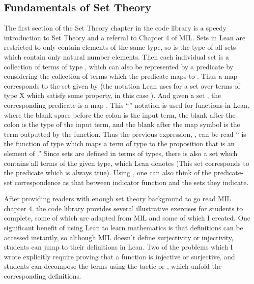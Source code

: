 \subsection{Fundamentals of Set Theory}

The first section of the Set Theory chapter in the code library is 
a speedy introduction to Set Theory and a referral to Chapter 4 of
MIL. Sets in Lean are restricted to only contain elements of the 
same type, so  is the type of all sets which contain
only natural number elements. Then each individual set 
is a collection of terms of type , which can also be represented
by a predicate  by considering the collection
of terms which the predicate maps to . 
Thus a map  corresponds to the set 
 given by  (the notation Lean uses for 
a set over terms of type X which satisfy some property, in this case ). 
And given a set , the corresponding
predicate is a map . 
This ``\lean{$\lambda$ \_ : \_ $\mapsto$ \_}'' notation is used for 
functions in Lean, where the blank space before the colon is the input term, the
blank after the colon is the type of the input term, and the blank after the
map symbol is the term outputted by the function. Thus the previous expression, 
, can be read 
`` is the function of type  which maps a term
 of type  to the proposition that  is an element of .''
Since sets are defined in terms of types, there is also a set which contains 
all terms of the given type, which Lean denotes  (This set
corresponds to the predicate which is always true). Using ,
one can also think of the predicate-set correspondence as
that between indicator function and the sets they indicate.

After providing readers with enough set theory background to go read 
MIL chapter 4, the code library provides several illustrative exercises for
students to complete, some of which are adapted from MIL and some of which I 
created. One significant benefit of using Lean to learn mathematics is that
definitions can be accessed instantly, so although MIL doesn't define 
surjectivity or injectivity, students can jump to their definitions in Lean.
Two of the problems which I wrote explicitly require proving that a function is
injective or surjective, and students can decompose the terms using the
tactic  or , which unfold
the corresponding definitions.

